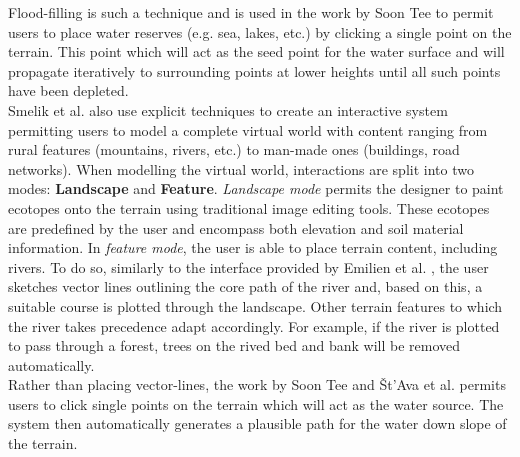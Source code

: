 Flood-filling is such a technique and is used in the work by Soon Tee \cite{Teoh2008} to permit users to place water reserves (e.g. sea, lakes, etc.) by clicking a single point on the terrain. This point which will act as the seed point for the water surface and will propagate iteratively to surrounding points at lower heights until all such points have been depleted. \\

Smelik et al. also use explicit techniques to create an interactive system permitting users to model a complete virtual world with content ranging from rural features (mountains, rivers, etc.) to man-made ones (buildings, road networks). When modelling the virtual world, interactions are split into two modes: \textbf{Landscape} and \textbf{Feature}. \textit{Landscape mode} permits the designer to paint ecotopes onto the terrain using traditional image editing tools. These ecotopes are predefined by the user and encompass both elevation and soil material information. In \textit{feature mode}, the user is able to place terrain content, including rivers. To do so, similarly to the interface provided by Emilien et al. \cite{Emilien2014}, the user sketches vector lines outlining the core path of the river and, based on this, a suitable course is plotted through the landscape. Other terrain features to which the river takes precedence adapt accordingly. For example, if the river is plotted to pass through a forest, trees on the rived bed and bank will be removed automatically. \\

Rather than placing vector-lines, the work by Soon Tee \cite{Teoh2008} and Št'Ava et al. \cite{StAva2008} permits users to click single points on the terrain which will act as the water source. The system then automatically generates a plausible path for the water down slope of the terrain.